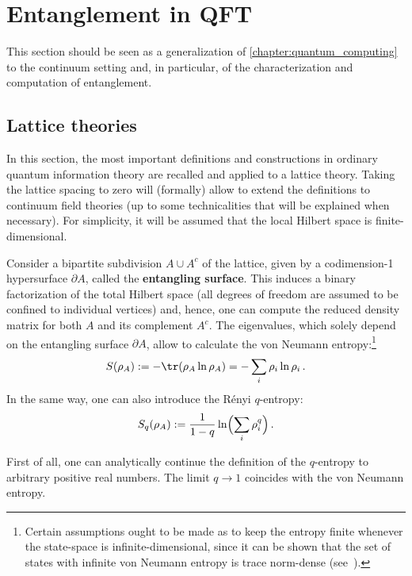 

\section{Entanglement in QFT}

    This section should be seen as a generalization of \cref{chapter:quantum_computing} to the continuum setting and, in particular, of the characterization and computation of entanglement.

\subsection{Lattice theories}

    In this section, the most important definitions and constructions in ordinary quantum information theory are recalled and applied to a lattice theory. Taking the lattice spacing to zero will (formally) allow to extend the definitions to continuum field theories (up to some technicalities that will be explained when necessary). For simplicity, it will be assumed that the local Hilbert space is finite-dimensional.

    Consider a bipartite subdivision $A\cup A^c$ of the lattice, given by a codimension-1 hypersurface $\partial A$, called the \textbf{entangling surface}. This induces a binary factorization of the total Hilbert space (all degrees of freedom are assumed to be confined to individual vertices) and, hence, one can compute the reduced density matrix for both $A$ and its complement $A^c$. The eigenvalues, which solely depend on the entangling surface $\partial A$, allow to calculate the von Neumann entropy:\footnote{Certain assumptions ought to be made as to keep the entropy finite whenever the state-space is infinite-dimensional, since it can be shown that the set of states with infinite von Neumann entropy is trace norm-dense (see~\citet{eisert_quantification_2002}).}
    \begin{gather}
        S(\rho_A) := -\tr(\rho_A\ln\rho_A) = -\sum_i\rho_i\ln\rho_i\,.
    \end{gather}
    In the same way, one can also introduce the R\'enyi $q$-entropy:
    \begin{gather}
        S_q(\rho_A) := \frac{1}{1-q}\ln\Bigl(\sum_i\rho_i^q\Bigr)\,.
    \end{gather}
    \begin{property}
         First of all, one can analytically continue the definition of the $q$-entropy to arbitrary positive real numbers. The limit $q\longrightarrow1$ coincides with the von Neumann entropy.
    \end{property}

